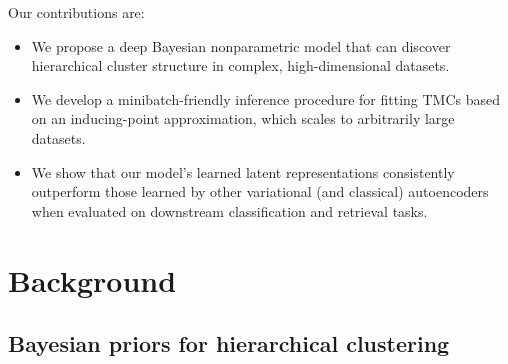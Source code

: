 
Our contributions are:
\begin{itemize}
    \item We propose a deep Bayesian nonparametric model that can discover hierarchical cluster structure in complex, high-dimensional datasets.
    \item We develop a minibatch-friendly inference procedure for fitting TMCs based on an inducing-point approximation, which scales to arbitrarily large datasets.
    \item We show that our model's learned latent representations consistently outperform those learned by other variational (and classical) autoencoders when evaluated on downstream classification and retrieval tasks.
\end{itemize}

\section{Background}

\subsection{Bayesian priors for hierarchical clustering}
\label{sec:bnhc}

